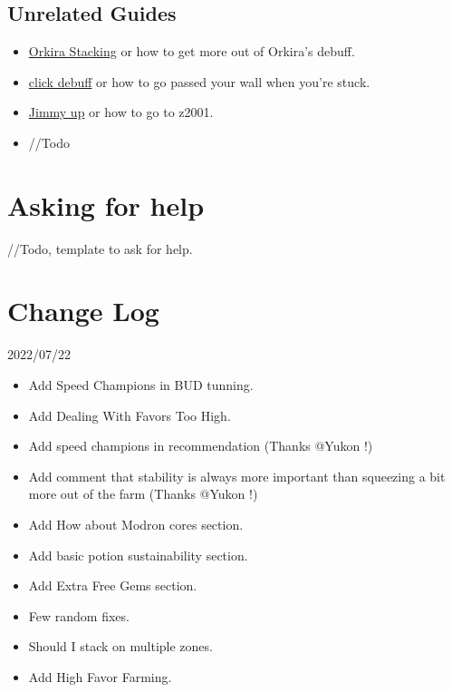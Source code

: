 \documentclass{article}
\begin{document}
\subsection{Unrelated Guides}

\begin{itemize}
\item \href{https://docs.google.com/document/d/1ZShfdd9h9hz15fAWaUrlEDUt8xRCrHKAM_ec07FKPVw/edit#}{Orkira Stacking} or how to get more out of Orkira's debuff.
\item \href{https://docs.google.com/document/d/1V9TPb8pxLRTs9NXbHEugz82syt5f-SYTPHTuGDYyxRE/edit}{click debuff} or how to go passed your wall when you're stuck.
\item \href{https://www.reddit.com/r/idlechampions/comments/w60vqa/afk_jimothy_with_the_great_wall_of_selise/}{Jimmy up} or how to go to z2001.

\item //Todo
\end{itemize}


\section{Asking for help}
//Todo, template to ask for help.



\section{Change Log}

2022/07/22 
\begin{itemize}
    \item Add Speed Champions in BUD tunning.
    \item Add Dealing With Favors Too High.
    \item Add speed champions in recommendation (Thanks @Yukon !)
    \item Add comment that stability is always more important than squeezing a bit more out of the farm (Thanks @Yukon !)
    \item Add How about Modron cores section.
    \item Add basic potion sustainability section.
    \item Add Extra Free Gems section.
    \item Few random fixes.
    \item Should I stack on multiple zones.
    \item Add High Favor Farming.
\end{itemize}
\end{document}
